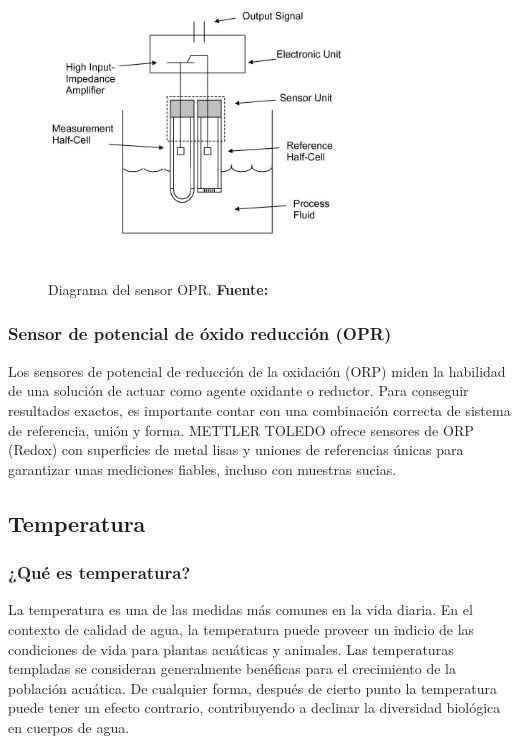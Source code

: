     \begin{figure}[H]
        \centering
        \includegraphics[width=80mm, height=80mm]{Imagenes/cap2/ORP_Sensor_Image.jpg}
        \caption {Diagrama del sensor OPR. \textbf{Fuente:}
        \cite{orp_sensor_measure_nodate} }
        \label{fig:opr}
    \end{figure}


\subsubsection{Sensor de potencial de \'oxido reducción (OPR)}
Los sensores de potencial de reducción de la oxidación (ORP) miden la habilidad de una solución de actuar como agente oxidante o reductor. 
Para conseguir resultados exactos, es importante contar con una combinación correcta de sistema de referencia, unión y forma. METTLER TOLEDO ofrece sensores de ORP (Redox) con superficies de metal lisas y uniones de referencias únicas para garantizar unas mediciones fiables, incluso con muestras sucias.

\subsection{Temperatura}
\subsubsection{¿Qué es temperatura?}
La temperatura es una de las medidas más comunes en la vida diaria. 
En el contexto de calidad de agua, la temperatura puede proveer un indicio de las condiciones de vida para plantas acuáticas y animales.  
Las temperaturas templadas se consideran generalmente benéficas para el crecimiento de la población acuática. 
De cualquier forma, después de cierto punto la temperatura puede tener un efecto contrario, contribuyendo a declinar la diversidad biológica en cuerpos de agua.

